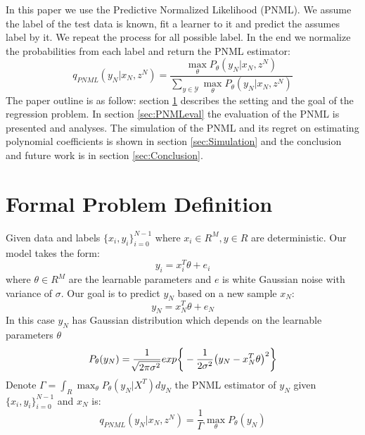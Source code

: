 \documentclass[final,1p,times]{elsarticle}
\def\pnmlSingle{\max_{\theta} P_\theta (y_N|x_N, z^N)}
\begin{document}
In this paper we use the Predictive Normalized Likelihood (PNML). We assume the label of the test data is known, fit a learner to it and predict the assumes label by it. We repeat the process for all possible label. In the end we normalize the probabilities from each label and return the PNML estimator:
\begin{equation}
    q_{PNML}(y_N|x_N,z^N)=\frac{\pnmlSingle}{\sum_{y\in \mathcal{Y}} \pnmlSingle}
\end{equation}
The paper outline is as follow:
section \ref{sec:FormalProblemDef} describes the setting and the goal of the regression problem. In section \ref{sec:PNMLeval} the evaluation of the PNML is presented and analyses. The simulation of the PNML and its regret on estimating polynomial coefficients is shown in section \ref{sec:Simulation} and the conclusion and future work is in section \ref{sec:Conclusion}.


\section{Formal Problem Definition} \label{sec:FormalProblemDef}
Given data and labels $\{x_i, y_i\}_{i=0}^{N-1}$ where $x_i \in R^M, y\in R$ are deterministic. Our model takes the form:
\begin{equation}
y_i=x_i^T \theta + e_i
\end{equation}
where $\theta \in R^M$ are the learnable parameters and $e$ is white Gaussian noise with variance of $\sigma$. Our goal is to predict $y_N$ based on a new sample $x_N$:
\begin{equation}
y_N = x_N^T \theta + e_N
\end{equation}
In this case $y_N$ has Gaussian distribution which depends on the learnable parameters $\theta$ 
\begin{equation}
P_{\theta}(y_N) 
=\frac{1}{\sqrt[]{2\pi\sigma^2}}exp\bigg\{-\frac{1}{2\sigma^2}\big(y_N- x_N^T\theta \big)^2\bigg\}  \\
\end{equation}
Denote $\Gamma=\int_R \max_{\theta} P_\theta(y_N|X^T)dy_N$ the PNML estimator of $y_N$ given $\{x_i,y_i\}_{i=0}^{N-1}$ and $x_N$ is:
\begin{equation} \label{eq:pnml_def}
q_{PNML}(y_N|x_N,z^N) = \frac{1}{\Gamma} \max_{\theta} P_\theta(y_N)
\end{equation}
\end{document}
